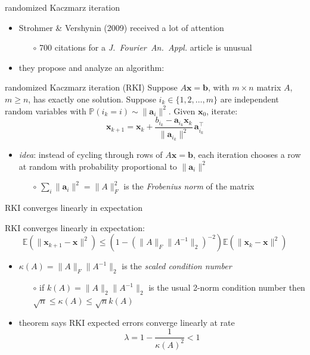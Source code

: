 \documentclass[usepdftitle=false,usenames,dvipsnames]{beamer}
\newcommand{\EE}{\mathbb{E}}
\newcommand{\PP}{\mathbb{P}}
\newcommand{\ba}{\mathbf{a}}
\newcommand{\bb}{\mathbf{b}}
\newcommand{\bx}{\mathbf{x}}
\begin{document}
\begin{frame}{randomized Kaczmarz iteration}

\begin{itemize}
\item Strohmer \& Vershynin (2009) received a lot of attention
    \begin{itemize}
    \item[$\circ$] 700 citations for a \emph{J.~Fourier~An.~Appl.} article is unusual
    \end{itemize}
\item they propose and analyze an algorithm:
\end{itemize}

\begin{block}{randomized Kaczmarz iteration (RKI)}
Suppose $A\bx=\bb$, with $m\times n$ matrix $A$, $m\ge n$, has exactly one solution.  Suppose $i_k \in \{1,2,\dots,m\}$ are independent random variables with $\PP(i_k = i) \sim \|\ba_i\|^2$.  Given $\bx_0$, iterate:
    $$\bx_{k+1} = \bx_k + \frac{b_{i_k} - \ba_{i_k} \bx_k}{\|\ba_{i_k}\|^2}\, \ba_{i_k}^\top$$
\end{block}

\begin{itemize}
\item \emph{idea}: instead of cycling through rows of $A\bx=\bb$, each iteration \alert{chooses a row at random with probability proportional to $\|\ba_i\|^2$}
    \begin{itemize}
    \item[$\circ$] $\sum_i \|\ba_i\|^2 = \|A\|_F^2$ is the \emph{Frobenius norm} of the matrix
    \end{itemize}
\end{itemize}
\end{frame}


\begin{frame}{RKI converges linearly in expectation}

\begin{theorem}
RKI converges linearly in expectation:
    $$\EE\left(\|\bx_{k+1} - \bx\|^2\right) \le \left(1 - (\|A\|_F \|A^{-1}\|_2)^{-2}\right)\EE\left(\|\bx_k - \bx\|^2\right)$$
\end{theorem}

\begin{itemize}
\item $\kappa(A) = \|A\|_F \|A^{-1}\|_2$ is the \emph{scaled condition number}
    \begin{itemize}
    \item[$\circ$] if $k(A) = \|A\|_2 \|A^{-1}\|_2$ is the usual 2-norm condition number then $\sqrt{n} \le \kappa(A) \le \sqrt{n} k(A)$
    \end{itemize}
\item theorem says RKI expected errors converge linearly at rate
    $$\lambda = 1 - \frac{1}{\kappa(A)^2} < 1$$
\end{itemize}
\end{frame}
\end{document}
